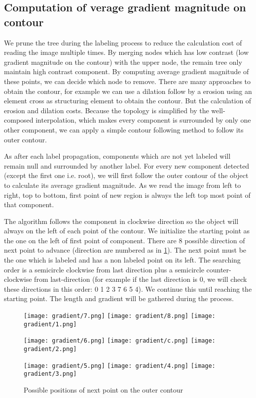 \subsection{Computation of verage gradient magnitude on contour} \label{subsec:ContourFollowing}
\par We prune the tree during the labeling process to reduce the calculation cost of reading the image multiple times. By merging nodes which has low contrast (low gradient magnitude on the contour) with the upper node, the remain tree only maintain high contrast component. By computing average gradient magnitude of these points, we can decide which node to remove. There are many approaches to obtain the contour, for example we can use a dilation follow by a erosion using an element cross as structuring element to obtain the contour. But the calculation of erosion and dilation costs. Because the topology is simplified by the well-composed interpolation, which makes every component is surrounded by only one other component, we can apply a simple contour following method to follow its outer contour.
\par As after each label propagation, components which are not yet labeled will remain null and surrounded by another label. For every new component detected (except the first one i.e. root), we will first follow the outer contour of the object to calculate its average gradient magnitude. As we read the image from left to right, top to bottom, first point of new region is always the left top most point of that component. 

The algorithm follows the component in clockwise direction so the object will always on the left of each point of the contour. We initialize the starting point as the one on the left of first point of component. There are 8 possible direction of next point to advance (direction are numbered as in \ref{fig:directionToSearch}). The next point must be the one which is labeled and has a non labeled point on its left. The searching order is a semicircle clockwise from last direction plus a semicircle counter-clockwise from last-direction (for example if the last direction is 0, we will check these directions in this order: 0 1 2 3 7 6 5 4). We continue this until reaching the starting point. The length and gradient will be gathered during the process. 

\begin{figure}
\texttt{[image: gradient/7.png]}
\texttt{[image: gradient/8.png]}
\texttt{[image: gradient/1.png]}
\centering

\texttt{[image: gradient/6.png]}
\texttt{[image: gradient/c.png]}
\texttt{[image: gradient/2.png]}
\centering

\texttt{[image: gradient/5.png]}
\texttt{[image: gradient/4.png]}
\texttt{[image: gradient/3.png]}
\centering
\caption{Possible positions of next point on the outer contour}
\label{fig:directionToSearch}
\end{figure}


